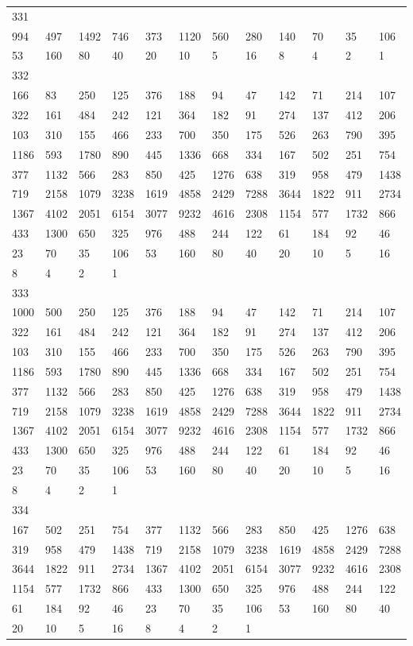 \begin{longtable}{llllllllllll}
331&&&&&&&&&&&\\
994& 497& 1492& 746& 373& 1120& 560& 280& 140& 70& 35& 106\\
53& 160& 80& 40& 20& 10& 5& 16& 8& 4& 2& 1\\

332&&&&&&&&&&&\\
166& 83& 250& 125& 376& 188& 94& 47& 142& 71& 214& 107\\
322& 161& 484& 242& 121& 364& 182& 91& 274& 137& 412& 206\\
103& 310& 155& 466& 233& 700& 350& 175& 526& 263& 790& 395\\
1186& 593& 1780& 890& 445& 1336& 668& 334& 167& 502& 251& 754\\
377& 1132& 566& 283& 850& 425& 1276& 638& 319& 958& 479& 1438\\
719& 2158& 1079& 3238& 1619& 4858& 2429& 7288& 3644& 1822& 911& 2734\\
1367& 4102& 2051& 6154& 3077& 9232& 4616& 2308& 1154& 577& 1732& 866\\
433& 1300& 650& 325& 976& 488& 244& 122& 61& 184& 92& 46\\
23& 70& 35& 106& 53& 160& 80& 40& 20& 10& 5& 16\\
8& 4& 2& 1& \\

333&&&&&&&&&&&\\
1000& 500& 250& 125& 376& 188& 94& 47& 142& 71& 214& 107\\
322& 161& 484& 242& 121& 364& 182& 91& 274& 137& 412& 206\\
103& 310& 155& 466& 233& 700& 350& 175& 526& 263& 790& 395\\
1186& 593& 1780& 890& 445& 1336& 668& 334& 167& 502& 251& 754\\
377& 1132& 566& 283& 850& 425& 1276& 638& 319& 958& 479& 1438\\
719& 2158& 1079& 3238& 1619& 4858& 2429& 7288& 3644& 1822& 911& 2734\\
1367& 4102& 2051& 6154& 3077& 9232& 4616& 2308& 1154& 577& 1732& 866\\
433& 1300& 650& 325& 976& 488& 244& 122& 61& 184& 92& 46\\
23& 70& 35& 106& 53& 160& 80& 40& 20& 10& 5& 16\\
8& 4& 2& 1& \\

334&&&&&&&&&&&\\
167& 502& 251& 754& 377& 1132& 566& 283& 850& 425& 1276& 638\\
319& 958& 479& 1438& 719& 2158& 1079& 3238& 1619& 4858& 2429& 7288\\
3644& 1822& 911& 2734& 1367& 4102& 2051& 6154& 3077& 9232& 4616& 2308\\
1154& 577& 1732& 866& 433& 1300& 650& 325& 976& 488& 244& 122\\
61& 184& 92& 46& 23& 70& 35& 106& 53& 160& 80& 40\\
20& 10& 5& 16& 8& 4& 2& 1& \\


\end{longtable}
